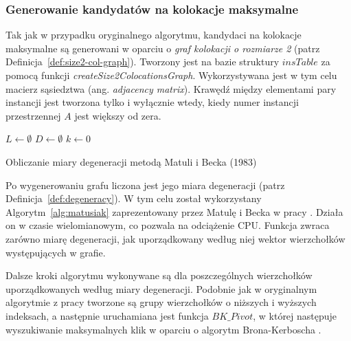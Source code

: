 \documentclass[12pt]{article}
\begin{document}
\subsubsection{Generowanie kandydatów na kolokacje maksymalne}
\label{subsec:kerbosz}

Tak jak w przypadku oryginalnego algorytmu, kandydaci na kolokacje maksymalne są generowani w oparciu o \textit{graf kolokacji o rozmiarze 2} (patrz Definicja~\ref{def:size2-col-graph}). Tworzony jest na bazie struktury $ insTable $ za pomocą funkcji \textit{createSize2ColocationsGraph}. Wykorzystywana jest w tym celu macierz sąsiedztwa (ang. \textit{adjacency matrix}). Krawędź między elementami pary instancji jest tworzona tylko i wyłącznie wtedy, kiedy numer instancji przestrzennej $ A $ jest większy od zera. 

\begin{algorithm}
$L \leftarrow \emptyset$\; 
$D \leftarrow \emptyset$\;
$k \leftarrow 0$\;
\caption{Obliczanie miary degeneracji metodą Matuli i Becka (1983)}
\label{alg:matusiak}
\end{algorithm}

Po wygenerowaniu grafu liczona jest jego miara degeneracji (patrz Definicja~\ref{def:degeneracy}). W tym celu został wykorzystany Algorytm~\ref{alg:matusiak} zaprezentowany przez Matulę i Becka w pracy \cite{matusiak}. Działa on w czasie wielomianowym, co pozwala na odciążenie CPU. Funkcja zwraca zarówno miarę degeneracji, jak uporządkowany według niej wektor wierzchołków występujących w grafie.

Dalsze kroki algorytmu wykonywane są dla poszczególnych wierzchołków uporządkowanych według miary degeneracji. Podobnie jak w oryginalnym algorytmie z pracy \cite{pivot} tworzone są grupy wierzchołków o niższych i wyższych indeksach, a następnie uruchamiana jest funkcja $ BK\_Pivot $, w której następuje wyszukiwanie maksymalnych klik w oparciu o algorytm Brona-Kerboscha \cite{kerbosz}. 
\end{document}
